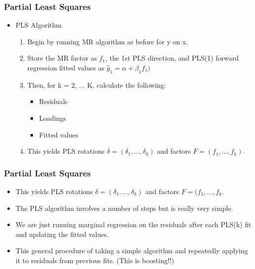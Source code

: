 \documentclass[
  shownotes,
  xcolor={svgnames},
  hyperref={colorlinks,citecolor=DarkBlue,linkcolor=DarkRed,urlcolor=DarkBlue}
  , aspectratio=169]{beamer}
\begin{document}
\begin{frame}[fragile]
\frametitle{Partial Least Squares }

\begin{itemize}
\item PLS Algorithm 
\medskip
\begin{enumerate}
\item Begin by running MR algorithm as before for y on x.
\medskip 
\item Store the MR factor as $f_1$, the 1st PLS direction, and PLS(1) forward regression fitted values as $\hat{y}_1=\alpha + \beta_1 f_1)$
\medskip 
\item Then, for k = 2, ... K, calculate the following:    
  \begin{itemize}
    \item Residuals     
    \item Loadings     
    \item Fitted values 
  \end{itemize}
\item This yields PLS rotations $\delta=(\delta_1,...,\delta_k)$ and factors $F=(f_1,...,f_k)$.
\end{enumerate}
\end{itemize}

\end{frame}
\begin{frame}[fragile]
\frametitle{Partial Least Squares }

\begin{itemize}
  \item This yields PLS rotations $\delta=(\delta_1,...,\delta_k)$ and factors $F=(f_1,...,f_k$.
\medskip 
\item The PLS algorithm involves a number of steps but is really very simple.
\medskip 
\item  We are just running marginal regression on the residuals after each PLS(k) fit and updating the fitted values.
\medskip 
 \item   This general procedure of taking a simple algorithm and repeatedly applying it to residuals from previous fits. (This is boosting!!) 
\end{itemize}


\end{frame}
\end{document}
